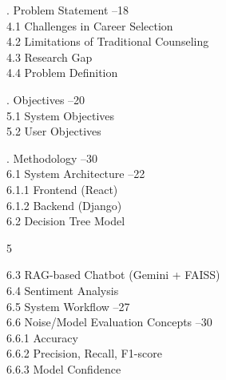 \documentclass[12pt,a4paper]{report}
\begin{document}
. Problem Statement --18\\
\hspace{0.5cm}4.1 Challenges in Career Selection \\
\hspace{0.5cm}4.2 Limitations of Traditional Counseling \\
\hspace{0.5cm}4.3 Research Gap \\
\hspace{0.5cm}4.4 Problem Definition \\

\vspace{0.5cm}

. Objectives --20\\
\hspace{0.5cm}5.1 System Objectives \\
\hspace{0.5cm}5.2 User Objectives \\

\vspace{0.5cm}

. Methodology --30\\
\hspace{0.5cm}6.1 System Architecture --22\\
\hspace{1cm}6.1.1 Frontend (React) \\
\hspace{1cm}6.1.2 Backend (Django) \\


\hspace{0.5cm}6.2 Decision Tree Model \\
\begin{center}
    5
\end{center}
\hspace{0.5cm}6.3 RAG-based Chatbot (Gemini + FAISS) \\

\hspace{0.5cm}6.4 Sentiment Analysis \\

\hspace{0.5cm}6.5 System Workflow --27\\



\hspace{0.5cm}6.6 Noise/Model Evaluation Concepts --30\\
\hspace{1cm}6.6.1 Accuracy \\
\hspace{1cm}6.6.2 Precision, Recall, F1-score \\
\hspace{1cm}6.6.3 Model Confidence \\
\end{document}
